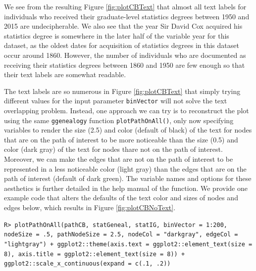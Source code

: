 \documentclass[11pt,a4paper,oldfontcommands,openany]{memoir}
\DeclareRobustCommand{\mybox}[2][gray!15]{%
\begin{tcolorbox}[   %
        breakable,
        left=0pt,
        right=0pt,
        top=0pt,
        bottom=0pt,
        colback=#1,
        colframe=#1,
        width=\dimexpr\textwidth\relax, 
        enlarge left by=0mm,
        boxsep=5pt,
        arc=0pt,outer arc=0pt,
        ]
        #2
\end{tcolorbox}
}
\numberwithin{equation}{section} %
\newcommand{\code}[1]{{\texttt{#1}}}
\newcommand{\pkg}[1]{{\texttt{#1}}}
\begin{document}
We see from the resulting Figure \ref{fig:plotCBText} that almost all text labels for individuals who received their graduate-level statistics degrees between 1950 and 2015 are undecipherable. We also see that the year Sir David Cox acquired his statistics degree is somewhere in the later half of the variable year for this dataset, as the oldest dates for acquisition of statistics degrees in this dataset occur around 1860. However, the number of individuals who are documented as receiving their statistics degrees between 1860 and 1950 are few enough so that their text labels are somewhat readable.

The text labels are so numerous in Figure \ref{fig:plotCBText} that simply trying different values for the input parameter \code{binVector} will not solve the text overlapping problem. Instead, one approach we can try is to reconstruct the plot using the same \pkg{ggenealogy} function \code{plotPathOnAll()}, only now specifying variables to render the size (2.5) and color (default of black) of the text for nodes that are on the path of interest to be more noticeable than the size (0.5) and color (dark gray) of the text for nodes thare not on the path of interest. Moreover, we can make the edges that are not on the path of interest to be represented in a less noticeable color (light gray) than the edges that are on the path of interest (default of dark green). The variable names and options for these aesthetics is further detailed in the help manual of the function. We provide one example code that alters the defaults of the text color and sizes of nodes and edges below, which results in Figure \ref{fig:plotCBNoText}.

\mybox{
\texttt{R> plotPathOnAll(pathCB, statGeneal, statIG, binVector = 1:200, nodeSize = .5, pathNodeSize = 2.5, nodeCol = "darkgray", edgeCol = "lightgray") + ggplot2::theme(axis.text = ggplot2::element\_text(size = 8), axis.title = ggplot2::element\_text(size = 8)) + ggplot2::scale\_x\_continuous(expand = c(.1, .2))}
}
\end{document}
